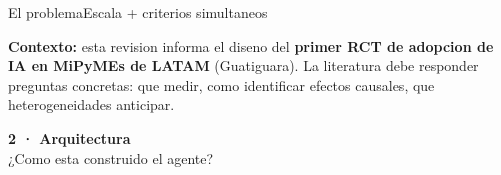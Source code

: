 \documentclass[aspectratio=169,10pt]{beamer}
\newenvironment{card}[1][cardbg]{%
  \begin{tcolorbox}[colback=#1,colframe=bidlight!40,arc=4pt,
    boxrule=0.4pt,left=5pt,right=5pt,top=4pt,bottom=4pt]}%
  {\end{tcolorbox}}
\begin{document}
\begin{frame}{El problema}{Escala + criterios simultaneos}
\vspace{3mm}
\begin{card}
\scriptsize\color{bidgray}
\textbf{\color{bidaccent}Contexto:} esta revision informa el diseno del \textbf{primer RCT de adopcion de IA en MiPyMEs de LATAM} (Guatiguara). La literatura debe responder preguntas concretas: que medir, como identificar efectos causales, que heterogeneidades anticipar.
\end{card}
\end{frame}

{
\begin{frame}[plain]\vspace{20mm}
\begin{center}
{\Large\bfseries\color{bidaccent}2 · Arquitectura}\\[5pt]
{\color{bidgray}\normalsize ¿Como esta construido el agente?}
\end{center}
\end{frame}
}
\end{document}
